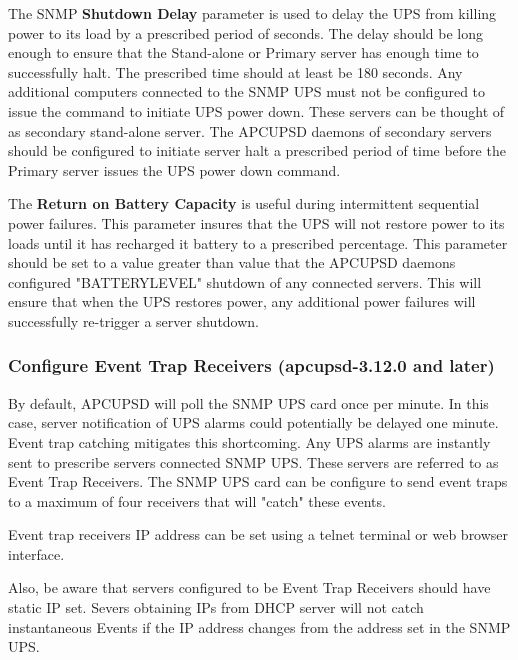 {{{{{{{The SNMP {\bf Shutdown Delay} parameter is used to delay the UPS from killing power to its load
by a prescribed period of seconds.  The delay should be long enough to ensure that the 
Stand-alone or Primary server has enough time to successfully halt.  The prescribed time should at least
be 180 seconds. Any additional computers connected to the SNMP UPS must not be configured
to issue the command to initiate UPS power down.  These servers can be thought of as secondary
stand-alone server.  The APCUPSD daemons of secondary servers should be configured to initiate server
halt a prescribed period of time before the Primary server issues the UPS power down command.


The {\bf Return on Battery Capacity} is useful during intermittent sequential power failures.
This parameter insures that the UPS will not restore power to its loads until it has
recharged it battery to a prescribed percentage. This parameter should be set to a value
greater than value that the APCUPSD daemons configured "BATTERYLEVEL" shutdown of any
connected servers.  This will ensure that when the UPS restores power, any additional power
failures will successfully re-trigger a server shutdown.



\subsubsection*{Configure Event Trap Receivers (apcupsd-3.12.0 and later)}

By default, APCUPSD will poll the SNMP UPS card once per minute.  In this case,
server notification of UPS alarms could potentially be delayed one minute.  Event trap
catching mitigates this shortcoming.  Any UPS alarms are instantly sent to 
prescribe servers connected SNMP UPS.  These servers are referred to as Event Trap Receivers.
The SNMP UPS card can be configure to send event traps to a maximum of four 
receivers that will "catch" these events.  

Event trap receivers IP address can be set using a telnet terminal or web browser interface.

Also, be aware that servers configured to be Event Trap Receivers should have static IP set.
Severs obtaining IPs from DHCP server will not catch instantaneous Events if the IP address changes from
the address set in the SNMP UPS.

\label{Connecting-APCUPSD-to-a-SNMP-UPS}

}}}}}}}

